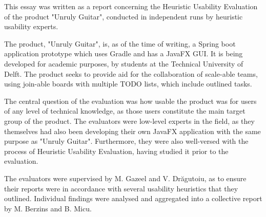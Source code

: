 This essay was written as a report concerning the Heuristic Usability Evaluation of the product "Unruly Guitar", conducted in independent runs by heuristic usability experts.

The product, "Unruly Guitar", is, as of the time of writing, a Spring boot application prototype which uses Gradle and has a JavaFX GUI. It is being developed for academic purposes, by students at the Technical University of Delft. The product seeks to provide aid for the collaboration of scale-able teams, using join-able boards with multiple TODO lists, which include outlined tasks.

The central question of the evaluation was how usable the product was for users of any level of technical knowledge, as those users constitute the main target group of the product. The evaluators were low-level experts in the field, as they themselves had also been developing their own JavaFX application with the same purpose as "Unruly Guitar". Furthermore, they were also well-versed with the process of Heuristic Usability Evaluation, having studied it prior to the evaluation.

The evaluators were supervised by M. Gazeel and V. Drăgutoiu, as to ensure their reports were in accordance with several usability heuristics that they outlined. Individual findings were analysed and aggregated into a collective report by M. Berzins and B. Micu.
